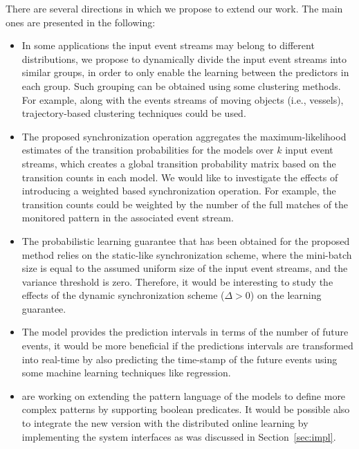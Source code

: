 There are several directions in which we propose to extend our work. The main ones are presented in the following:

\begin{itemize}[noitemsep]
	
\item In some applications the input event streams may belong to different distributions, we propose to dynamically divide the input event streams into similar groups, in order to only enable the learning between the predictors in each group.  Such grouping can be obtained using some clustering methods. For example, along with the events streams of moving objects (i.e., vessels), trajectory-based clustering techniques \cite{lee2007trajectory,liu2014knowledge} could be used.
 
\item  The proposed synchronization operation aggregates the maximum-likelihood estimates of the transition probabilities for the \pmcmr models over $k$ input event streams, which creates a global transition probability matrix based on the transition counts in each model. We would like to investigate the effects of introducing a weighted based synchronization operation. For example, the transition counts could be weighted by the number of the full matches of the monitored pattern in the associated event stream. 

\item The probabilistic learning guarantee that has been obtained for the proposed method relies on the static-like synchronization scheme, where the mini-batch size is equal to the assumed uniform size of the input event streams, and the variance threshold is zero. Therefore, it would be interesting to study the effects of the dynamic synchronization scheme ($\Delta>0$) on the learning guarantee.

\item The \pmcmr model provides the prediction intervals in terms of the number of future events, it would be more beneficial if the predictions intervals are transformed into real-time by also predicting the time-stamp of the future events using some machine learning techniques like regression.  

\item \citet{alevizos2017event} are working on extending the pattern language of the \pmcmr models to define more complex patterns by supporting boolean predicates. It would be possible also to integrate the new version with the distributed online learning by implementing the system interfaces as was discussed in Section~\ref{sec:impl}.


\end{itemize}
